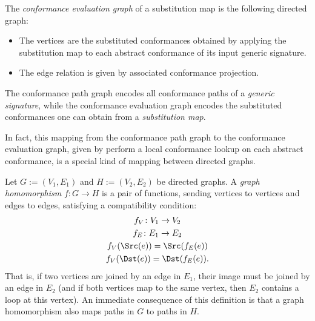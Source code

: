 \documentclass[../generics]{subfiles}
\begin{document}
\begin{definition}
The \emph{conformance evaluation graph} of a substitution map is the following directed graph:
\begin{itemize}
\item The vertices are the substituted conformances obtained by applying the substitution map to each abstract conformance of its input generic signature.
\item The edge relation is given by associated conformance projection.
\end{itemize}
The conformance path graph encodes all conformance paths of a \emph{generic signature}, while the conformance evaluation graph encodes the substituted conformances one can obtain from a \emph{substitution map}.
\end{definition}
In fact, this mapping from the conformance path graph to the conformance evaluation graph, given by perform a local conformance lookup on each abstract conformance, is a special kind of mapping between directed graphs.
\begin{definition}
Let $G:=(V_1,E_1)$ and $H:=(V_2,E_2)$ be directed graphs. A \emph{graph homomorphism} $f\colon G\rightarrow H$ is a pair of functions, sending vertices to vertices and edges to edges, satisfying a compatibility condition:
\begin{gather*}
f_V\colon V_1\rightarrow V_2\\
f_E\colon E_1\rightarrow E_2\\
f_V(\Src(e)) = \Src(f_E(e))\\
f_V(\Dst(e)) = \Dst(f_E(e)).
\end{gather*}
That is, if two vertices are joined by an edge in $E_1$, their image must be joined by an edge in $E_2$ (and if both vertices map to the same vertex, then $E_2$ contains a loop at this vertex). An immediate consequence of this definition is that a graph homomorphism also maps paths in $G$ to paths in $H$.
\end{definition}
\end{document}
